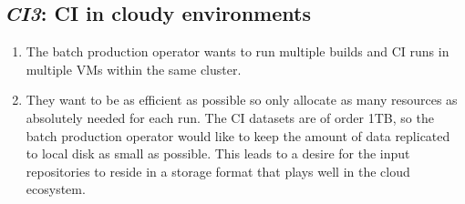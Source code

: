 \documentclass[DM,toc,lsstdraft]{lsstdoc}
\newcommand{\usecase}[3]{%
\subsection{\emph{#1}: #2}
\begin{enumerate}[label=\alph*.]
#3
\end{enumerate}
}
\begin{document}
\usecase{CI3}{CI in cloudy environments}{%

\item
The batch production operator wants to run multiple builds and CI runs in multiple VMs within the same cluster.

\item
They want to be as efficient as possible so only allocate as many resources as absolutely needed for each run.
The CI datasets are of order 1TB, so the batch production operator would like to keep the amount of data replicated to local disk as small as possible.
This leads to a desire for the input repositories to reside in a storage format that plays well in the cloud ecosystem.

}


\end{document}
